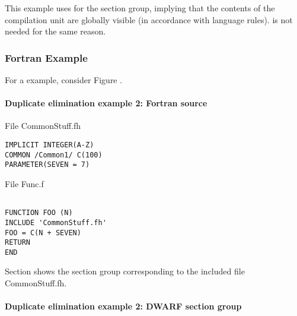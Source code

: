 This example uses  for the section group,
implying that the contents of the compilation unit are
globally visible (in accordance with 
 language rules).
 is not needed for the same reason.

\subsubsection{Fortran Example}


For a 
example, consider 
Figure .


\paragraph{Duplicate elimination example 2: Fortran source} 
\label{app:duplicateeliminationexample2fortransource}

File CommonStuff.fh

\begin{lstlisting}
IMPLICIT INTEGER(A-Z)
COMMON /Common1/ C(100)
PARAMETER(SEVEN = 7)
\end{lstlisting}

File Func.f
\begin{lstlisting}

FUNCTION FOO (N)
INCLUDE 'CommonStuff.fh'
FOO = C(N + SEVEN)
RETURN
END
\end{lstlisting}


Section 
shows the section group 
corresponding to the included file 
CommonStuff.fh.

\paragraph{Duplicate elimination example 2: DWARF section group}
\label{app:duplicateeliminationexample2dwarfsectiongroup}

